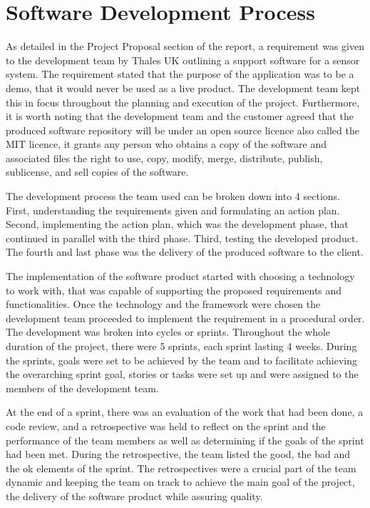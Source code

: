 \documentclass{l3proj}
\begin{document}
\section{Software Development Process}

As detailed in the Project Proposal section of the report, a requirement was given to the development team by Thales UK outlining a support software for a sensor system. The requirement stated that the purpose of the application was to be a demo, that it would never be used as a live product. The development team kept this in focus throughout the planning and execution of the project. Furthermore, it is worth noting that the development team and the customer agreed that the produced software repository will be under an open source licence also called the MIT licence, it grants any person who obtains a copy of the software and associated files the right to use, copy, modify, merge, distribute, publish, sublicense, and sell copies of the software. \cite{MIT_License}

The development process the team used can be broken down into 4 sections. First, understanding the requirements given and formulating an action plan. Second, implementing the action plan, which was the development phase, that continued in parallel with the third phase. Third, testing the developed product. The fourth and last phase was the delivery of the produced software to the client. 

The implementation of the software product started with choosing a technology to work with, that was capable of supporting the proposed requirements and functionalities. Once the technology and the framework were chosen the development team proceeded to implement the requirement in a procedural order. The development was broken into cycles or sprints. Throughout the whole duration of the project, there were 5 sprints, each sprint lasting 4 weeks. During the sprints, goals were set to be achieved by the team and to facilitate achieving the overarching sprint goal, stories or tasks were set up and were assigned to the members of the development team. 

At the end of a sprint, there was an evaluation of the work that had been done, a code review, and a retrospective was held to reflect on the sprint and the performance of the team members as well as determining if the goals of the sprint had been met. During the retrospective, the team listed the good, the bad and the ok elements of the sprint. The retrospectives were a crucial part of the team dynamic and keeping the team on track to achieve the main goal of the project, the delivery of the software product while assuring quality. 
\end{document}
